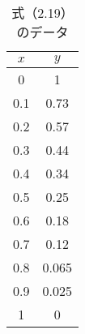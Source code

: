 \begin{table}[b] 
  \begin{center}
    \caption{式（2.19）のデータ}
    \begin{tabular}{|c|c|} \hline
      $x$ & $y$   \\ \hline \hline
      0   & 1     \\ \hline
      0.1 & 0.73  \\ \hline
      0.2 & 0.57  \\ \hline
      0.3 & 0.44  \\ \hline
      0.4 & 0.34  \\ \hline
      0.5 & 0.25  \\ \hline
      0.6 & 0.18  \\ \hline
      0.7 & 0.12  \\ \hline
      0.8 & 0.065 \\ \hline
      0.9 & 0.025 \\ \hline
      1   & 0     \\ \hline
    \end{tabular}
    \label{tab:log}
  \end{center}
\end{table}
